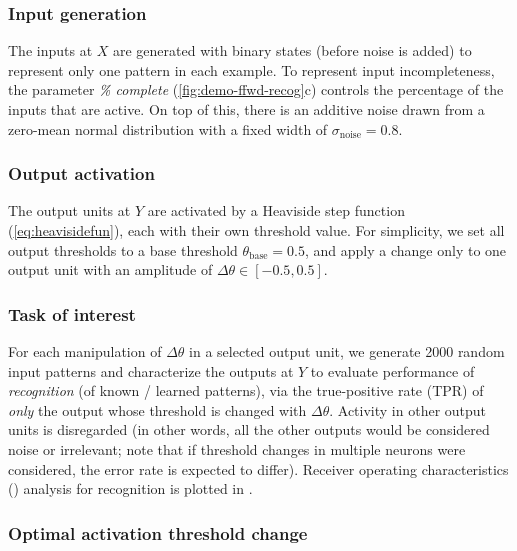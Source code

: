 \subsubsection*{Input generation}

The inputs at $X$ are generated with binary states (before noise is added)
        to represent only one pattern in each example.
    To represent input incompleteness, the parameter \textit{\% complete}
        (\autoref{fig:demo-ffwd-recog}c)
        controls the percentage of the inputs that are active.
    On top of this, there is an additive noise
        drawn from a zero-mean normal distribution
        with a fixed width of $\sigma_{\text{noise}} = 0.8$.

\subsubsection*{Output activation}

The output units at $Y$ are activated by a Heaviside step function (\autoref{eq:heavisidefun}),
    each with their own threshold value.
    For simplicity, we set all output thresholds
        to a base threshold $\theta_{\text{base}} = 0.5$,
        and apply a change only to one output unit with an amplitude of $\Delta \theta \in [-0.5,0.5]$.

\subsubsection*{Task of interest}

For each manipulation of $\Delta \theta$ in a selected output unit,
        we generate 2000 random input patterns
        and characterize the outputs at $Y$ to evaluate performance of \textit{recognition} (of known / learned patterns),
        via the true-positive rate (TPR) of \textit{only} the output whose threshold is changed with $\Delta \theta$.
    Activity in other output units is disregarded
        (in other words, all the other outputs would be considered noise or irrelevant; note that if threshold changes in multiple neurons were considered, the error rate is expected to differ).
    Receiver operating characteristics
        ()
        analysis for recognition is plotted in
        .

\subsubsection*{Optimal activation threshold change}

